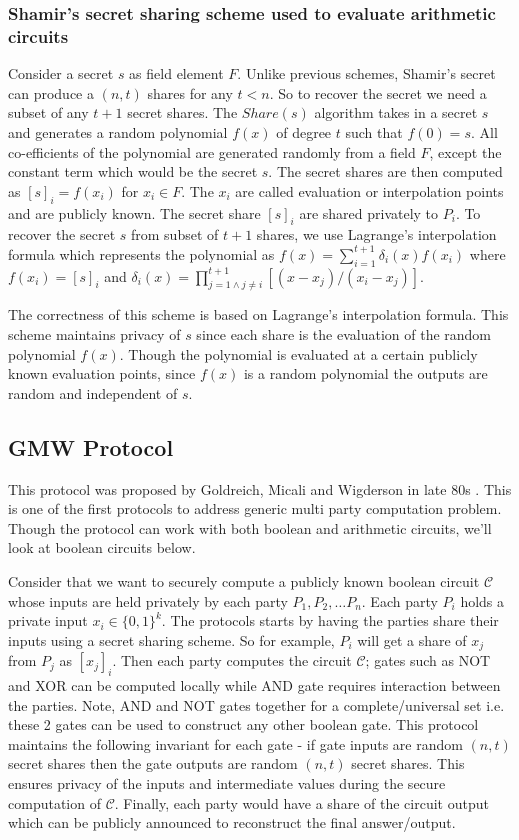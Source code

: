 \documentclass[11pt]{article}
\begin{document}
\subsubsection*{Shamir's secret sharing scheme used to evaluate arithmetic circuits}
Consider a secret $s$ as field element $F$. Unlike previous schemes, Shamir's secret can produce a $(n, t)$ shares for any $t < n$. So to recover the secret we need a subset of any $t+1$ secret shares. The $Share(s)$ algorithm takes in a secret $s$ and generates a random polynomial $f(x)$ of degree $t$ such that $f(0) = s$. All co-efficients of the polynomial are generated randomly from a field $F$, except the constant term which would be the secret $s$. The secret shares are then computed as $[s]_i = f(x_i)$ for $x_i \in F$. The $x_i$ are called evaluation or interpolation points and are publicly known. The secret share $[s]_i$ are shared privately to $P_i$. To recover the secret $s$ from subset of $t+1$ shares, we use Lagrange's interpolation formula which represents the polynomial as $f(x) = \sum_{i=1}^{t+1} \delta_i(x)f(x_i)$ where $f(x_i) = [s]_i$ and $\delta_i(x) = \prod_{j=1 \land j \ne i}^{t+1} [(x - x_j)/(x_i - x_j)]$.

The correctness of this scheme is based on Lagrange's interpolation formula. This scheme maintains privacy of $s$ since each share is the evaluation of the random polynomial $f(x)$. Though the polynomial is evaluated at a certain publicly known evaluation points, since $f(x)$ is a random polynomial the outputs are random and independent of $s$.

\subsection*{GMW Protocol}

This protocol was proposed by Goldreich, Micali and Wigderson in late 80s \cite{15}. This is one of the first protocols to address generic multi party computation problem. Though the protocol can work with both boolean and arithmetic circuits, we'll look at boolean circuits below.

Consider that we want to securely compute a publicly known boolean circuit $\mathcal{C}$ whose inputs are held privately by each party $P_1, P_2, \dots P_n$. Each party $P_i$ holds a private input $x_i \in \{0, 1\}^k$. The protocols starts by having the parties share their inputs using a secret sharing scheme. So for example, $P_i$ will get a share of $x_j$ from $P_j$ as $[x_j]_i$. Then each party computes the circuit $\mathcal{C}$; gates such as NOT and XOR can be computed locally while AND gate requires interaction between the parties. Note, AND and NOT gates together for a complete/universal set i.e. these 2 gates can be used to construct any other boolean gate. This protocol maintains the following invariant for each gate - if gate inputs are random $(n, t)$ secret shares then the gate outputs are random $(n, t)$ secret shares. This ensures privacy of the inputs and intermediate values during the secure computation of $\mathcal{C}$. Finally, each party would have a share of the circuit output which can be publicly announced to reconstruct the final answer/output.
\end{document}

